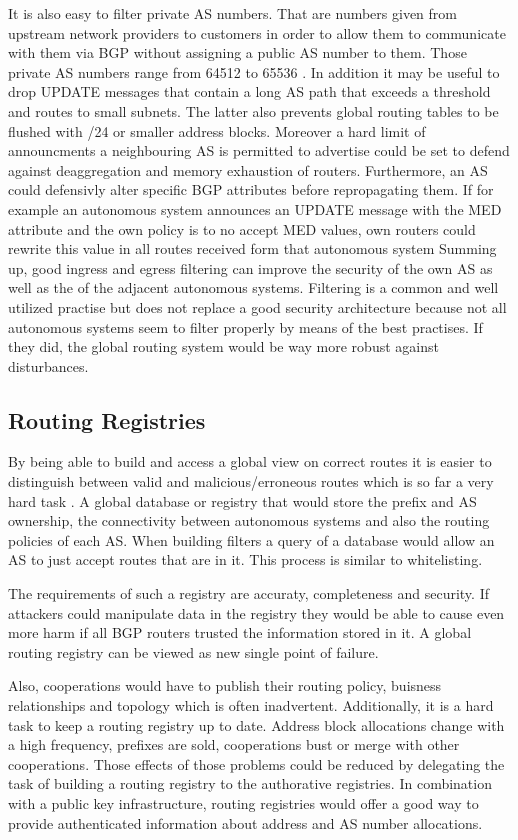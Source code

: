 \documentclass[12pt,a4paper]{IEEEtran}
\begin{document}
		It is also easy to filter private AS numbers. That are numbers given from upstream network providers to customers in order to allow them to communicate with them via BGP without assigning a public AS number to them. Those private AS numbers range from 64512 to 65536 \citep{Hawkinson1996}.
		In addition it may be useful to drop UPDATE messages that contain a long AS path that exceeds a threshold and routes to small subnets. The latter also prevents global routing tables to be flushed with /24 or smaller address blocks. 
		Moreover a hard limit of announcments a neighbouring AS is permitted to advertise could be set to defend against deaggregation and memory exhaustion of routers.
		Furthermore, an AS could defensivly alter specific BGP attributes before repropagating them. If for example an autonomous system  announces an UPDATE message with the MED attribute and the own policy is to no accept MED values, own routers could rewrite this value in all routes received form that autonomous system \citep{Butler2010}	
		Summing up, good ingress and egress filtering can improve the security of the own AS as well as the of the  adjacent autonomous systems.
		Filtering is a common and well utilized practise but does not replace a good security architecture because not all autonomous systems seem to filter properly by means of the best practises. If they did, the global routing system would be way more robust against disturbances. 

       \subsection{Routing Registries}
       By being able to build and access a global view on correct routes it is easier to distinguish between valid and malicious/erroneous routes which is so far a very hard task \citep{Butler2010}. 
		A global database or registry that would store the prefix and AS ownership, the connectivity between autonomous systems and also the routing policies of each AS. 	
		When building filters a query of a database would allow an AS to just accept routes that are in it. This process is similar to whitelisting.
		
		The requirements of such a registry are accuraty, completeness and security. If attackers could manipulate data in the registry they would be able to cause even more harm if all BGP routers trusted the information stored in it. A global routing registry can be viewed as new single point of failure. 
			
			Also, cooperations would have to publish their routing policy, buisness relationships and topology which is often inadvertent.
			Additionally, it is a hard task to keep a routing registry up to date. Address block allocations change with a high frequency, prefixes are sold, cooperations bust or merge with other cooperations. Those effects of those problems could be reduced by delegating the task of building a routing registry to the authorative registries. In combination with a public key infrastructure, routing registries would offer a good way to provide authenticated information about address and AS number allocations.
		
\end{document}
